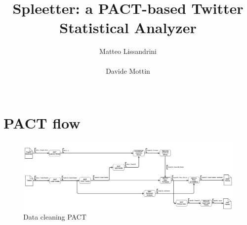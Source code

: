 \documentclass{vldb}
\begin{document}
\title{Spleetter: a PACT-based Twitter Statistical Analyzer}


\author{
\alignauthor
Matteo Lissandrini\\
       \\
\alignauthor
Davide Mottin\\
      \\
}


\maketitle

\pagestyle{plain}
\maketitle
\begin{abstract}

\end{abstract}

%
%










  

\clearpage
\appendix
\section{PACT flow}

\vspace*{3cm}
\begin{figure}[h]
\centering
\includegraphics[angle=90,height=0.75\textheight]{images/strato_pact_pt1.png} 
\caption{Data cleaning PACT}
\label{fig:cleaning}
\end{figure}
\end{document}
